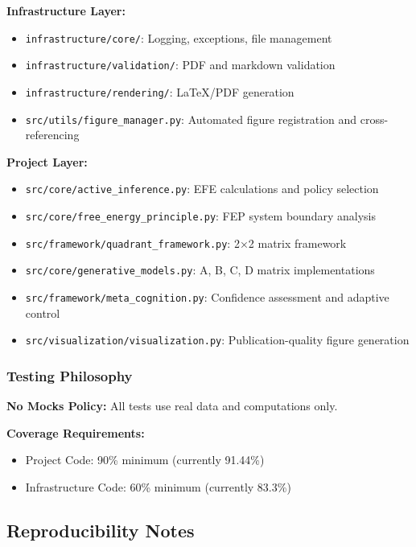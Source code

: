 \documentclass[
]{article}
\providecommand{\tightlist}{%
  \setlength{\itemsep}{0pt}\setlength{\parskip}{0pt}}
\begin{document}
\textbf{Infrastructure Layer:}

\begin{itemize}
\tightlist
\item
  \texttt{infrastructure/core/}: Logging, exceptions, file management
\item
  \texttt{infrastructure/validation/}: PDF and markdown validation
\item
  \texttt{infrastructure/rendering/}: LaTeX/PDF generation
\item
  \texttt{src/utils/figure\_manager.py}: Automated figure registration
  and cross-referencing
\end{itemize}

\textbf{Project Layer:}

\begin{itemize}
\tightlist
\item
  \texttt{src/core/active\_inference.py}: EFE calculations and policy
  selection
\item
  \texttt{src/core/free\_energy\_principle.py}: FEP system boundary
  analysis
\item
  \texttt{src/framework/quadrant\_framework.py}: 2×2 matrix framework
\item
  \texttt{src/core/generative\_models.py}: A, B, C, D matrix
  implementations
\item
  \texttt{src/framework/meta\_cognition.py}: Confidence assessment and
  adaptive control
\item
  \texttt{src/visualization/visualization.py}: Publication-quality
  figure generation
\end{itemize}

\subsubsection{Testing Philosophy}\label{testing-philosophy}

\textbf{No Mocks Policy:} All tests use real data and computations only.

\textbf{Coverage Requirements:}

\begin{itemize}
\tightlist
\item
  Project Code: 90\% minimum (currently 91.44\%)
\item
  Infrastructure Code: 60\% minimum (currently 83.3\%)
\end{itemize}

\subsection{Reproducibility Notes}\label{reproducibility-notes}
\end{document}
